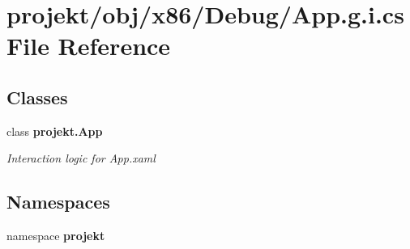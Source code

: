 \section{projekt/obj/x86/\+Debug/\+App.g.\+i.\+cs File Reference}
\label{x86_2Debug_2App_8g_8i_8cs}
\subsection*{Classes}
\begin{DoxyCompactItemize}
\item 
class \textbf{ projekt.\+App}
\begin{DoxyCompactList}\small\item\em Interaction logic for App.\+xaml \end{DoxyCompactList}\end{DoxyCompactItemize}
\subsection*{Namespaces}
\begin{DoxyCompactItemize}
\item 
namespace \textbf{ projekt}
\end{DoxyCompactItemize}
